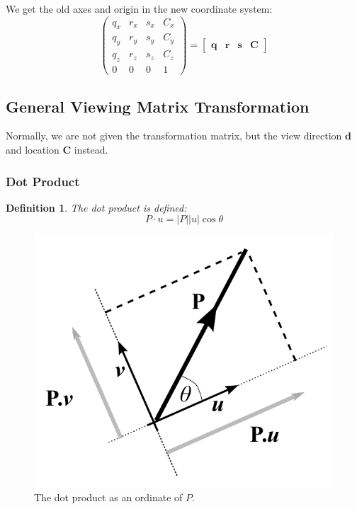\documentclass[11pt]{article}
\newtheorem{defn}{Definition}
\begin{document}
We get the old axes and origin in the new coordinate system:
\[
  \begin{pmatrix}
    q_x & r_x & s_x & C_x \\
    q_y & r_y & s_y & C_y \\
    q_z & r_z & s_z & C_z \\
    0 & 0 & 0 & 1
  \end{pmatrix}
  =
  \begin{bmatrix} \textbf{q} & \textbf{r} & \textbf{s} & \textbf{C} \end{bmatrix}
\]

\subsection{General Viewing Matrix Transformation}
Normally, we are not given the transformation matrix, but the view direction $\textbf{d}$ and location $\textbf{C}$ instead.

\subsubsection{Dot Product}
\begin{defn}
  The dot product is defined:
  \[
    P \cdot u = \lvert P \rvert \lvert u \rvert \cos \theta  
  \]
\end{defn}

\begin{figure}[h]
  \caption{The dot product as an ordinate of $P$.}
  \includegraphics[scale=0.2]{dotproduct}
  \centering
\end{figure}
\end{document}
